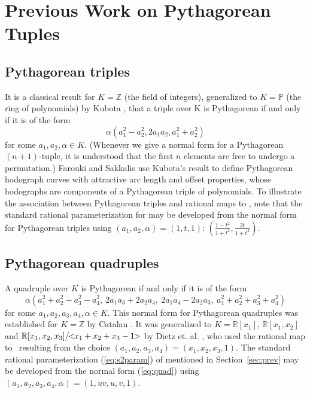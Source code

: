 \documentclass[12pt]{article}
\begin{document}


\section{Previous Work on Pythagorean Tuples}
\label{sec:prevpyth}

\subsection{Pythagorean triples}

It is a classical result for $K = \mathbb{Z}$ (the field of integers),
generalized to $K = \mathbb{P}$ (the ring of polynomials) 
by Kubota \cite{kubota72},
that a triple over K is Pythagorean if and only if
it is of the form 
\[
\alpha(a_1^2 - a_2^2, 2a_1a_2, a_1^2 + a_2^2)
\]
for some $a_1,a_2,\alpha \in K$.
(Whenever we give a normal form for a Pythagorean $(n+1)$-tuple,
it is understood that the first $n$ elements are free to undergo
a permutation.)
Farouki and Sakkalis \cite{farouki90} use
Kubota's result to define Pythagorean hodograph curves
with attractive arc length and offset properties,
whose hodographs are components of a Pythagorean triple
of polynomials.
To illustrate the association between Pythagorean triples and rational maps to ,
note that the standard rational parameterization for  
may be developed from the normal form for Pythagorean triples 
using $(a_1,a_2,\alpha) = (1,t,1)$:
$(\frac{1-t^2}{1+t^2}, \frac{2t}{1+t^2})$.

\subsection{Pythagorean quadruples}

A quadruple over $K$ is Pythagorean if and only if it is of the form
\begin{equation}
\label{eq:quad}
\alpha (a_1^2+a_2^2-a_3^2-a_4^2,\ 2a_1a_3+2a_2a_4,\ 2a_1a_4-2a_2a_3,
\ a_1^2+a_2^2+a_3^2+a_4^2)
\end{equation}
for some $a_1,a_2,a_3,a_4,\alpha \in K$.
This normal form for Pythagorean quadruples was established 
for $K = \mathbb{Z}$ by Catalan \cite{catalan85}.
It was generalized to $K = \mathbb{R}[x_1]$, 
$\mathbb{R}[x_1,x_2]$ and 
$\mathbb{R}[x_1,x_2,x_3]/\hspace{-.05in}<\hspace{-.05in}
x_1+x_2+x_3-1
\hspace{-.05in}>$ 
by Dietz et. al. \cite{dietz93}, who used the rational map to \ 
resulting from the choice $(a_1,a_2,a_3,a_4) = (x_1,x_2,x_3,1)$.
The standard rational parameterization (\ref{eq:s2param}) of  mentioned
in Section~\ref{sec:prev}
may be developed from the normal form (\ref{eq:quad})
using $(a_1,a_2,a_3,a_4,\alpha) = (1,uv,u,v,1)$.
\end{document}
